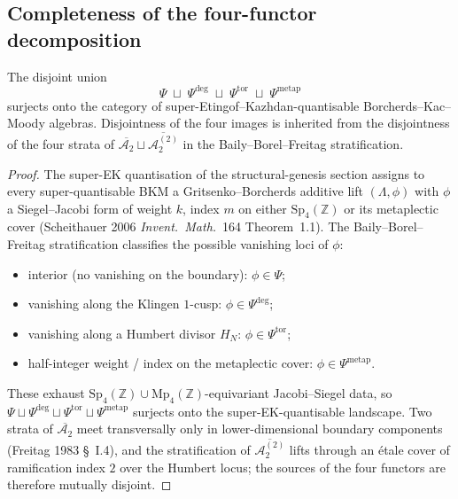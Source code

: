 \subsection{Completeness of the four-functor decomposition}
\label{subsec:four-functor-completeness}

\begin{theorem}
\label{thm:four-functor-completeness}
The disjoint union
\[
\Psi \;\sqcup\; \Psi^{\deg} \;\sqcup\; \Psi^{\mathrm{tor}}
\;\sqcup\; \Psi^{\mathrm{metap}}
\]
surjects onto the category of super-Etingof--Kazhdan-quantisable
Borcherds--Kac--Moody algebras. Disjointness of the four images
is inherited from the disjointness of the four strata of
$\overline{\mathcal A_2}\sqcup\overline{\mathcal A_2^{(2)}}$
in the Baily--Borel--Freitag stratification.
\end{theorem}

\begin{proof}[Proof]
The super-EK quantisation of the structural-genesis section
assigns to every super-quantisable BKM a Gritsenko--Borcherds
additive lift $(\Lambda, \phi)$ with $\phi$ a Siegel--Jacobi form
of weight $k$, index $m$ on either $\mathrm{Sp}_4(\mathbb Z)$ or
its metaplectic cover (Scheithauer 2006 \textit{Invent.~Math.}~164
Theorem~1.1). The Baily--Borel--Freitag stratification classifies
the possible vanishing loci of $\phi$:
\begin{itemize}
\item interior (no vanishing on the boundary): $\phi \in \Psi$;
\item vanishing along the Klingen $1$-cusp: $\phi \in \Psi^{\deg}$;
\item vanishing along a Humbert divisor $H_N$:
$\phi \in \Psi^{\mathrm{tor}}$;
\item half-integer weight / index on the metaplectic cover:
$\phi \in \Psi^{\mathrm{metap}}$.
\end{itemize}
These exhaust
$\mathrm{Sp}_4(\mathbb Z)\cup \mathrm{Mp}_4(\mathbb Z)$-equivariant
Jacobi--Siegel data, so
$\Psi \sqcup \Psi^{\deg} \sqcup \Psi^{\mathrm{tor}} \sqcup
\Psi^{\mathrm{metap}}$ surjects onto the super-EK-quantisable
landscape. Two strata of $\overline{\mathcal A_2}$ meet
transversally only in lower-dimensional boundary components
(Freitag 1983 \S~I.4), and the stratification of
$\overline{\mathcal A_2^{(2)}}$ lifts through an \'etale cover
of ramification index $2$ over the Humbert locus; the sources
of the four functors are therefore mutually disjoint.
\end{proof}

